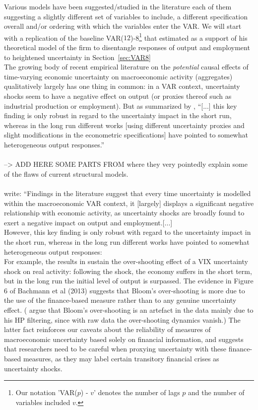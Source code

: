 \documentclass[a4paper,11pt,listof=nochaptergap,oneside,pointednumbers,bibtotoc,bigheadings,liststotoc]{scrbook}
\theoremstyle{mysatz}
\theoremstyle{mydefinition}
\theoremstyle{mytheorem}
\theoremstyle{mybemerkung}
\begin{document}
Various models have been suggested/studied in the literature each of them suggesting a slightly different set of variables to include, a different specification overall and/or ordering with which the variables enter the VAR. We will start with a replication of the baseline VAR($12$)-8\footnote{Our notation 'VAR($p$) - $v$' denotes the number of lags $p$ and the number of variables included $v$.} that \citet{bloom:09} estimated as a support of his theoretical model of the firm to disentangle responses of output and employment to heightened uncertainty in Section~\ref{sec:VAR8}
\\
The growing body of recent empirical literature on the \textit{potential} causal effects of time-varying economic uncertainty on macroeconomic activity (aggregates) qualitatively largely has one thing in common: in a VAR context, uncertainty shocks seem to have a negative effect on output (or proxies thereof such as industrial production or employment). But as summarized by \citet[p. 23]{bontempietal:16}, ``[...] this key finding is only robust in regard to the uncertainty impact in the short run, whereas in the long run different works [using different uncertainty proxies and slight modifications in the econometric specifications] have pointed to somewhat heterogeneous output responses.''\\
\\
--> ADD HERE SOME PARTS FROM \citet{ludvigsonetal:18} where they very pointedly explain some of the flaws of current structural models.\\
\\
\citet{bontempietal:16} write: ``Findings in the literature suggest that every time uncertainty is modelled within the macroeconomic VAR context, it [largely] displays a significant negative relationship with economic activity, as uncertainty shocks are broadly found to exert a negative impact on output and employment.[...] \\
	However, this key finding is only robust with regard to the uncertainty impact in the short run, whereas in the long run different works have pointed to somewhat heterogeneous output responses:\\
	For example, the results in \citet{bloom:09} sustain the over-shooting effect of a VIX uncertainty shock on real activity: following the shock, the economy suffers in the short term, but in the long run the initial level of output is surpassed. The evidence in Figure 6 of Bachmann et al (2013) suggests that Bloom's over-shooting is more due to the use of the finance-based measure rather than to any genuine uncertainty effect. (\citet{juradoetal:15} argue that Bloom's over-shooting is an artefact in the data mainly due to his HP filtering, since with raw data the over-shooting dynamics vanish.) The latter fact reinforces our caveats about the reliability of measures of macroeconomic uncertainty based solely on financial information, and suggests that researchers need to be careful when proxying uncertainty with these finance-based measures, as they may label certain transitory financial crises as uncertainty shocks.\\
\end{document}
